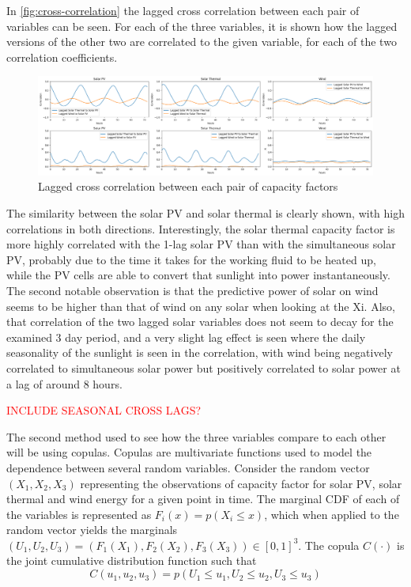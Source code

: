 In \autoref{fig:cross-correlation} the lagged cross correlation between each pair of variables can be seen. For each of the three variables, it is shown how the lagged versions of the other two are correlated to the given variable, for each of the two correlation coefficients. 

\begin{figure}[ht]
    \centering
    \captionsetup{justification=centering}
    \includegraphics[width=\linewidth]{assets/cross-correlation.png}
    \caption{Lagged cross correlation between each pair of capacity factors}
    \label{fig:cross-correlation}
\end{figure}

The similarity between the solar PV and solar thermal is clearly shown, with high correlations in both directions. Interestingly, the solar thermal capacity factor is more highly correlated with the 1-lag solar PV than with the simultaneous solar PV, probably due to the time it takes for the working fluid to be heated up, while the PV cells are able to convert that sunlight into power instantaneously. The second notable observation is that the predictive power of solar on wind seems to be higher than that of wind on any solar when looking at the Xi. Also, that correlation of the two lagged solar variables does not seem to decay for the examined 3 day period, and a very slight lag effect is seen where the daily seasonality of the sunlight is seen in the correlation, with wind being negatively correlated to simultaneous solar power but positively correlated to solar power at a lag of around 8 hours. 

\textcolor{red}{INCLUDE SEASONAL CROSS LAGS?}

The second method used to see how the three variables compare to each other will be using copulas. Copulas are multivariate functions used to model the dependence between several random variables. Consider the random vector $(X_1,X_2,X_3)$ representing the observations of capacity factor for solar PV, solar thermal and wind energy for a given point in time. The marginal CDF of each of the variables is represented as $F_i\left(x\right)=p\left(X_i\leq x\right)$, which when applied to the random vector yields the marginals $\left(U_1,U_2,U_3\right)=\left(F_1\left(X_1\right),F_2\left(X_2\right),F_3\left(X_3\right)\right)\in \left[0,1\right]^3$. The copula $C(\cdot)$ is the joint cumulative distribution function such that 
\begin{equation}
    C\left(u_1,u_2,u_3\right)=p\left(U_1\leq u_1,U_2\leq u_2,U_3\leq u_3\right)
\end{equation}

